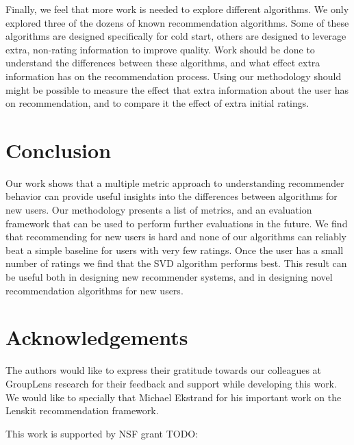 \documentclass[letterpaper]{sig-alternate}
\begin{document}
  Finally, we feel that more work is needed to explore different algorithms.
  We only explored three of the dozens of known recommendation algorithms.
  Some of these algorithms are designed specifically for cold start, others are designed to leverage extra, non-rating information to improve quality.
  Work should be done to understand the differences between these algorithms, and what effect extra information has on the recommendation process.
  Using our methodology should might be possible to measure the effect that extra information about the user has on recommendation, and to compare it the effect of extra initial ratings.



\section{Conclusion}

  Our work shows that a multiple metric approach to understanding recommender behavior can provide useful insights into the differences between algorithms for new users.
  Our methodology presents a list of metrics, and an evaluation framework that can be used to perform further evaluations in the future.
  We find that recommending for new users is hard and none of our algorithms can reliably beat a simple baseline for users with very few ratings.
  Once the user has a small number of ratings we find that the SVD algorithm performs best.
  This result can be useful both in designing new recommender systems, and in designing novel recommendation algorithms for new users.


\section{Acknowledgements}
  
  The authors would like to express their gratitude towards our colleagues at GroupLens research for their feedback and support while developing this work.
  We would like to specially that Michael Ekstrand for his  important work on the Lenskit recommendation framework.

  This work is supported by NSF grant TODO:


\end{document}
